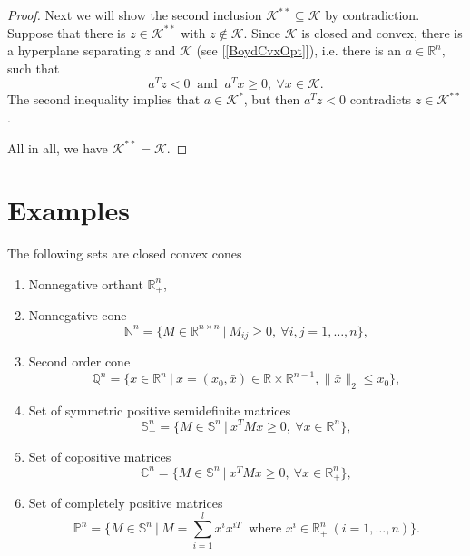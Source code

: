 \documentclass[12pt]{book}
\theoremstyle{definition}
\begin{document}
\begin{appendix}
\begin{proof}
Next we will show the second inclusion  $\mathcal{K}^{**} \subseteq \mathcal{K}$ by contradiction.
Suppose that there is $z \in \mathcal{K}^{**}$ with $z \notin \mathcal{K}$.
Since $\mathcal{K}$ is closed and convex, there is a hyperplane separating $z$ and $\mathcal{K}$ (see [\ref{BoydCvxOpt}]), i.e. there is an $a \in \mathbb{R}^n, $ such that 
$$ a^Tz <0  \ \mbox{ and } \ a^Tx\geq 0, \ \forall x\in\mathcal{K}.$$
The second inequality implies that $a\in \mathcal{K}^*$, but then  $ a^Tz <0 $ contradicts $z\in \mathcal{K}^{**}$.

All in all,  we have $\mathcal{K}^{**} = \mathcal{K}$.
\end{proof}



%
%
%
%



\section{Examples}


 The following sets are closed convex cones 
\label{ExClosedConvexCones}
\begin{enumerate}
\item Nonnegative orthant $\mathbb{R}^n_+$,
\item Nonnegative cone $$\mathbb{N}^n = \{M\in \mathbb{R}^{n\times n} \ \vert \ M_{ij} \geq 0, \ \forall i,j=1,\dots ,n\},$$
\item Second order cone $$\mathbb{Q}^n=\{x\in \mathbb{R}^n \ | \ x = (x_0,\bar{x}) \in \mathbb{R}\times\mathbb{R}^{n-1}, \|\bar{x}\|_2\leq x_0\},$$
\item Set of symmetric positive semidefinite matrices  $$\mathbb{S}^n_+ = \{M \in \mathbb{S}^n \ \vert \ x^TMx\geq 0, \  \forall x\in \mathbb{R}^n\},$$
\item Set of copositive matrices $$\mathbb{C}^n = \{M \in \mathbb{S}^n \ \vert \ x^TMx\geq 0, \  \forall x\in \mathbb{R}^n_+\},$$
\item Set of completely positive matrices $$\mathbb{P}^n = \{M\in \mathbb{S}^n \ | \ M = \sum_{i = 1}^l x^{i}x^{iT} \ \mbox{ where } x^i \in \mathbb{R}^n_+ \ (i = 1,\dots ,n) \}.$$
\end{enumerate} 


\end{appendix}
\end{document}
